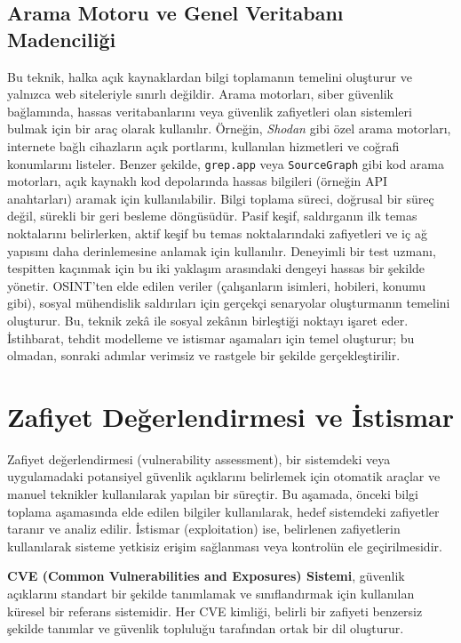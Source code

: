 \subsection{Arama Motoru ve Genel Veritabanı Madenciliği}

Bu teknik, halka açık kaynaklardan bilgi toplamanın temelini oluşturur ve yalnızca web siteleriyle sınırlı değildir. Arama motorları, siber güvenlik bağlamında, hassas veritabanlarını veya güvenlik zafiyetleri olan sistemleri bulmak için bir araç olarak kullanılır. Örneğin, \textit{Shodan} gibi özel arama motorları, internete bağlı cihazların açık portlarını, kullanılan hizmetleri ve coğrafi konumlarını listeler. Benzer şekilde, \texttt{grep.app} veya \texttt{SourceGraph} gibi kod arama motorları, açık kaynaklı kod depolarında hassas bilgileri (örneğin API anahtarları) aramak için kullanılabilir.
Bilgi toplama süreci, doğrusal bir süreç değil, sürekli bir geri besleme döngüsüdür. Pasif keşif, saldırganın ilk temas noktalarını belirlerken, aktif keşif bu temas noktalarındaki zafiyetleri ve iç ağ yapısını daha derinlemesine anlamak için kullanılır. Deneyimli bir test uzmanı, tespitten kaçınmak için bu iki yaklaşım arasındaki dengeyi hassas bir şekilde yönetir. OSINT'ten elde edilen veriler (çalışanların isimleri, hobileri, konumu gibi), sosyal mühendislik saldırıları için gerçekçi senaryolar oluşturmanın temelini oluşturur. Bu, teknik zekâ ile sosyal zekânın birleştiği noktayı işaret eder. İstihbarat, tehdit modelleme ve istismar aşamaları için temel oluşturur; bu olmadan, sonraki adımlar verimsiz ve rastgele bir şekilde gerçekleştirilir.

\section{Zafiyet Değerlendirmesi ve İstismar}

Zafiyet değerlendirmesi (vulnerability assessment), bir sistemdeki veya uygulamadaki potansiyel güvenlik açıklarını belirlemek için otomatik araçlar ve manuel teknikler kullanılarak yapılan bir süreçtir. Bu aşamada, önceki bilgi toplama aşamasında elde edilen bilgiler kullanılarak, hedef sistemdeki zafiyetler taranır ve analiz edilir. İstismar (exploitation) ise, belirlenen zafiyetlerin kullanılarak sisteme yetkisiz erişim sağlanması veya kontrolün ele geçirilmesidir.

\textbf{CVE (Common Vulnerabilities and Exposures) Sistemi}, güvenlik açıklarını standart bir şekilde tanımlamak ve sınıflandırmak için kullanılan küresel bir referans sistemidir. Her CVE kimliği, belirli bir zafiyeti benzersiz şekilde tanımlar ve güvenlik topluluğu tarafından ortak bir dil oluşturur.

